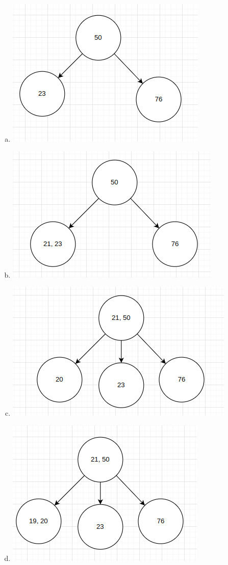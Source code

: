 \documentclass[a4paper,10pt]{article}
\begin{document}
\begin{enumerate}
\begin{enumerate}[(a)]
	\item \centerline{\includegraphics[scale=0.5]{fig6}}
	\item \centerline{\includegraphics[scale=0.5]{fig7}}
	\item \centerline{\includegraphics[scale=0.5]{fig8}}
	\item \centerline{\includegraphics[scale=0.5]{fig9}}

\end{enumerate}
\end{enumerate}
\end{document}
